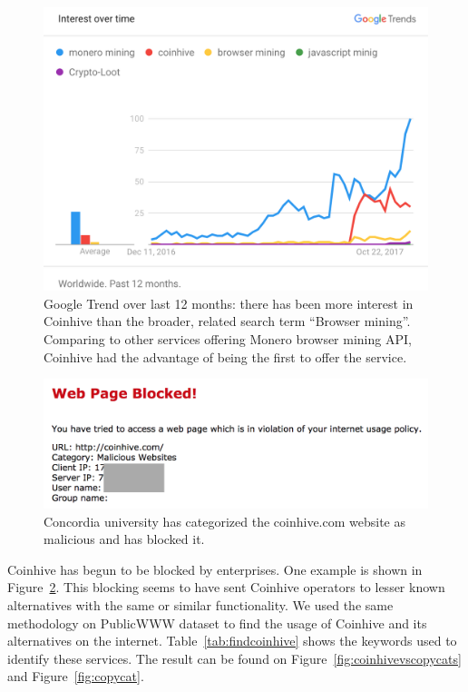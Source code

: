 \begin{figure}[t]
\centering
\includegraphics[width=0.9\linewidth]{figures/usage_over_time2.png}
\caption{Google Trend over last 12 months: there has been more interest in Coinhive than the broader, related search term ``Browser mining''. Comparing to other services offering Monero browser mining API, Coinhive had the advantage of being the first to offer the service. \label{fig:trend}}
\end{figure}



\begin{figure}[h]
\centering
\includegraphics[width=0.9\linewidth]{figures/coinhive_blocked.png}
\caption{Concordia university has categorized the coinhive.com website as malicious and has blocked it.\label{fig:concordia}}
\end{figure}

Coinhive has begun to be blocked by enterprises. One example is shown in Figure~\ref{fig:concordia}. This blocking seems to have sent Coinhive operators to lesser known alternatives with the same or similar functionality. We used the same methodology on PublicWWW dataset to find the usage of Coinhive and its alternatives on the internet. Table~\ref{tab:findcoinhive} shows the keywords used to identify these services. The result can be found on Figure~\ref{fig:coinhivevscopycats} and Figure~\ref{fig:copycat}.

